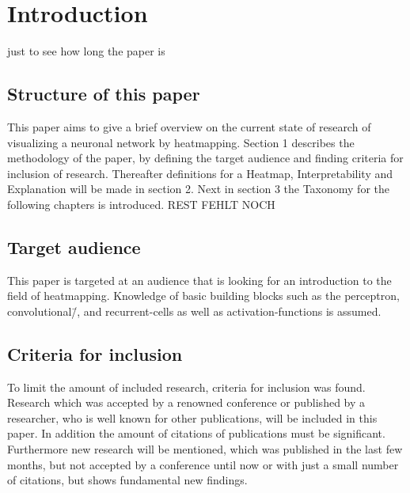 \section{Introduction}
just to see how long the paper is

\subsection{Structure of this paper}
This paper aims to give a brief overview on the current state of research of visualizing a neuronal network by heatmapping. Section 1 describes the methodology of the paper, by defining the target audience and finding criteria for inclusion of research.
Thereafter definitions for a Heatmap, Interpretability and Explanation will be made in section 2. Next in section 3 the Taxonomy for the following chapters is introduced. REST FEHLT NOCH


\subsection{Target audience}
This paper is targeted at an audience that is looking for an introduction to 
the field of heatmapping. Knowledge of basic building blocks such as the 
perceptron, convolutional\=/, and recurrent-cells as well as activation-functions is assumed.

\subsection{Criteria for inclusion}
To limit the amount of included research, criteria for inclusion was found. Research which was accepted by a renowned conference or published by a researcher, who is well known for other publications, will be included in this paper. In addition the amount of citations of publications must be significant. Furthermore new research will be mentioned, which was published in the last few months, but not accepted by a conference until now or with just a small number of citations, but shows fundamental new findings.